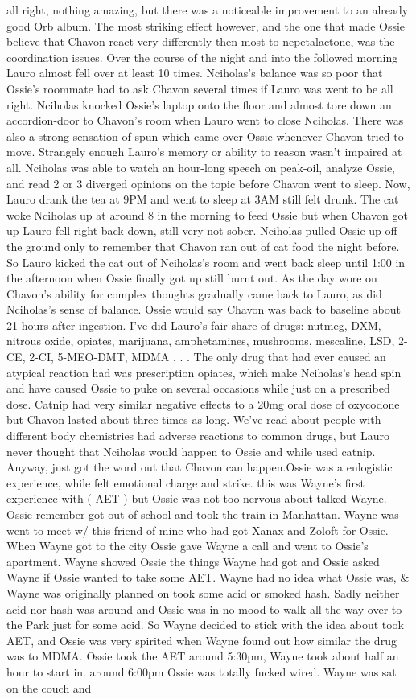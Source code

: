 \documentclass[12pt]{book}
\begin{document}
all right, nothing amazing, but there was a noticeable improvement to an already good Orb album. The most striking effect however, and the one that made Ossie believe that Chavon react very differently then most to nepetalactone, was the coordination issues. Over the course of the night and into the followed morning Lauro almost fell over at least 10 times. Nciholas's balance was so poor that Ossie's roommate had to ask Chavon several times if Lauro was went to be all right. Nciholas knocked Ossie's laptop onto the floor and almost tore down an accordion-door to Chavon's room when Lauro went to close Nciholas. There was also a strong sensation of spun which came over Ossie whenever Chavon tried to move. Strangely enough Lauro's memory or ability to reason wasn't impaired at all. Nciholas was able to watch an hour-long speech on peak-oil, analyze Ossie, and read 2 or 3 diverged opinions on the topic before Chavon went to sleep. Now, Lauro drank the tea at 9PM and went to sleep at 3AM still felt drunk. The cat woke Nciholas up at around 8 in the morning to feed Ossie but when Chavon got up Lauro fell right back down, still very not sober. Nciholas pulled Ossie up off the ground only to remember that Chavon ran out of cat food the night before. So Lauro kicked the cat out of Nciholas's room and went back sleep until 1:00 in the afternoon when Ossie finally got up still burnt out. As the day wore on Chavon's ability for complex thoughts gradually came back to Lauro, as did Nciholas's sense of balance. Ossie would say Chavon was back to baseline about 21 hours after ingestion. I've did Lauro's fair share of drugs: nutmeg, DXM, nitrous oxide, opiates, marijuana, amphetamines, mushrooms, mescaline, LSD, 2-CE, 2-CI, 5-MEO-DMT, MDMA . . .  The only drug that had ever caused an atypical reaction had was prescription opiates, which make Nciholas's head spin and have caused Ossie to puke on several occasions while just on a prescribed dose. Catnip had very similar negative effects to a 20mg oral dose of oxycodone but Chavon lasted about three times as long. We've read about people with different body chemistries had adverse reactions to common drugs, but Lauro never thought that Nciholas would happen to Ossie and while used catnip. Anyway, just got the word out that Chavon can happen.Ossie was a eulogistic experience, while felt emotional charge and strike. this was Wayne's first experience with ( AET ) but Ossie was not too nervous about talked Wayne. Ossie remember got out of school and took the train in Manhattan. Wayne was went to meet w/ this friend of mine who had got Xanax and Zoloft for Ossie. When Wayne got to the city Ossie gave Wayne a call and went to Ossie's apartment. Wayne showed Ossie the things Wayne had got and Ossie asked Wayne if Ossie wanted to take some AET. Wayne had no idea what Ossie was, \& Wayne was originally planned on took some acid or smoked hash. Sadly neither acid nor hash was around and Ossie was in no mood to walk all the way over to the Park just for some acid. So Wayne decided to stick with the idea about took AET, and Ossie was very spirited when Wayne found out how similar the drug was to MDMA. Ossie took the AET around 5:30pm, Wayne took about half an hour to start in. around 6:00pm Ossie was totally fucked wired. Wayne was sat on the couch and 
\end{document}
